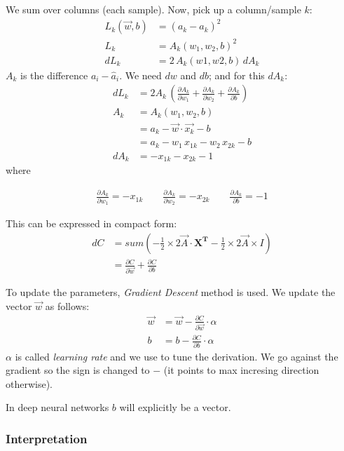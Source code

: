 We sum over columns (each sample). Now, pick up a column/sample $k$:
\begin{align*}
  L_k(\vec{w},b) &= (a_k - \hat{a}_k)^2\\
    L_k &= A_k(w_1, w_2, b)^2\\
    dL_k &= 2\,A_k(w1,w2,b)\,dA_k
\end{align*}
$A_k$ is the difference $a_i-\hat{a}_i$. We need $dw$ and $db$; and for this $dA_k$:
\begin{align*}
  dL_k  &= 2A_k\,(\frac{\partial A_k}{\partial w_1} + \frac{\partial A_k}{\partial w_2} + \frac{\partial A_k}{\partial b}) \\
  A_k &= A_k(w_1, w_2, b)\\
  &= a_k - \vec{w}\cdot{}\vec{x_k} - b\\
  &= a_k - w_1\,x_{1k} - w_2\,x_{2k}-b\\
  dA_k &= -x_{1k} - x_{2k} -1
\end{align*}
where 
\begin{center}
\begin{align*}
  \frac{\partial A_{k}}{\partial w_1} = -x_{1k}\hspace{2em} \frac{\partial A_{k}}{\partial w_2} = -x_{2k}\hspace{2em} \frac{\partial A_k}{\partial b} = -1
\end{align*} 
\end{center}

This can be expressed in compact form:
\begin{align*}
  dC &= sum(-\frac{1}{2}\times{}2\vec{A}\cdot{}\mathbf{X^T} -\frac{1}{2}\times{}2\vec{A}\times{}I)\\
  &= \frac{\partial C}{\partial \vec{w}} + \frac{\partial C}{\partial b} 
\end{align*}

To update the parameters, \textit{Gradient Descent} method is used. We update the vector $\vec{w}$ as follows:
\begin{align}
  \vec{w} &= \vec{w} -\frac{\partial C}{\partial \vec{w}}\cdot{}\alpha\\
  b &= b -\frac{\partial C}{\partial b}\cdot{}\alpha
\end{align}
$\alpha$ is called \textit{learning rate} and we use to tune the derivation. We go against the gradient so the sign is changed to $-$ (it points to max incresing direction otherwise).

In deep neural networks $b$ will explicitly be a vector.

\subsubsection{Interpretation}

